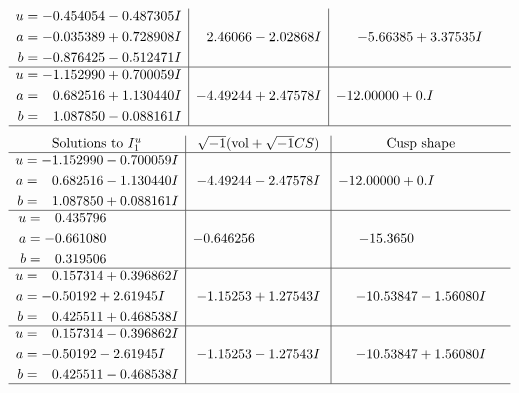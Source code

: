 \documentclass[1p]{elsarticle_modified}
\theoremstyle{definition}
\newcommand{\I}{\sqrt{-1}}
\begin{document}
$$\begin{array}{c|c|c}
\begin{aligned}
u &= -0.454054 - 0.487305 I \\
a &= -0.035389 + 0.728908 I \\
b &= -0.876425 - 0.512471 I\end{aligned}
 & \phantom{-}2.46066 - 2.02868 I & -5.66385 + 3.37535 I \\ \hline\begin{aligned}
u &= -1.152990 + 0.700059 I \\
a &= \phantom{-}0.682516 + 1.130440 I \\
b &= \phantom{-}1.087850 - 0.088161 I\end{aligned}
 & -4.49244 + 2.47578 I & -12.00000 + 0. I\phantom{ +0.000000I}\\
 \hline 
 \end{array}$$\newpage$$\begin{array}{c|c|c}  
\text{Solutions to }I^u_{1}& \I (\text{vol} + \sqrt{-1}CS) & \text{Cusp shape}\\
 \hline 
\begin{aligned}
u &= -1.152990 - 0.700059 I \\
a &= \phantom{-}0.682516 - 1.130440 I \\
b &= \phantom{-}1.087850 + 0.088161 I\end{aligned}
 & -4.49244 - 2.47578 I & -12.00000 + 0. I\phantom{ +0.000000I} \\ \hline\begin{aligned}
u &= \phantom{-}0.435796\phantom{ +0.000000I} \\
a &= -0.661080\phantom{ +0.000000I} \\
b &= \phantom{-}0.319506\phantom{ +0.000000I}\end{aligned}
 & -0.646256\phantom{ +0.000000I} & -15.3650\phantom{ +0.000000I} \\ \hline\begin{aligned}
u &= \phantom{-}0.157314 + 0.396862 I \\
a &= -0.50192 + 2.61945 I \\
b &= \phantom{-}0.425511 + 0.468538 I\end{aligned}
 & -1.15253 + 1.27543 I & -10.53847 - 1.56080 I \\ \hline\begin{aligned}
u &= \phantom{-}0.157314 - 0.396862 I \\
a &= -0.50192 - 2.61945 I \\
b &= \phantom{-}0.425511 - 0.468538 I\end{aligned}
 & -1.15253 - 1.27543 I & -10.53847 + 1.56080 I\\
 \hline 
 \end{array}$$\newpage\newpage\renewcommand{\arraystretch}{1}
\end{document}
